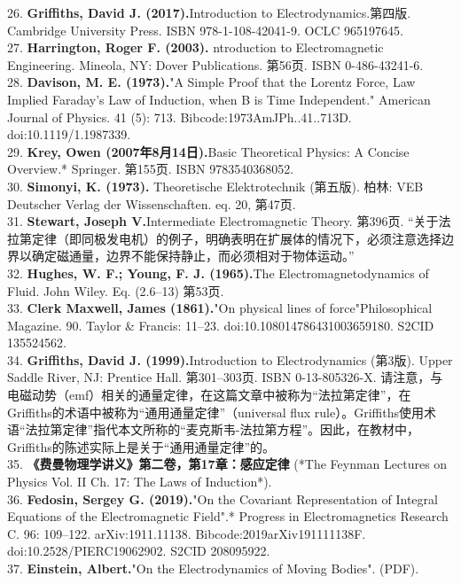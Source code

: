 26. \textbf{Griffiths, David J. (2017).}Introduction to Electrodynamics.第四版. Cambridge University Press. ISBN 978-1-108-42041-9. OCLC 965197645.\\
27. \textbf{Harrington, Roger F. (2003).} ntroduction to Electromagnetic Engineering. Mineola, NY: Dover Publications. 第56页. ISBN 0-486-43241-6.\\
28. \textbf{Davison, M. E. (1973).}"A Simple Proof that the Lorentz Force, Law Implied Faraday's Law of Induction, when B is Time Independent." American Journal of Physics. 41 (5): 713. Bibcode:1973AmJPh..41..713D. doi:10.1119/1.1987339.\\
29. \textbf{Krey, Owen (2007年8月14日).}Basic Theoretical Physics: A Concise Overview.* Springer. 第155页. ISBN 9783540368052.\\
30. \textbf{Simonyi, K. (1973).} Theoretische Elektrotechnik (第五版). 柏林: VEB Deutscher Verlag der Wissenschaften. eq. 20, 第47页.\\
31. \textbf{Stewart, Joseph V.}Intermediate Electromagnetic Theory. 第396页. “关于法拉第定律（即同极发电机）的例子，明确表明在扩展体的情况下，必须注意选择边界以确定磁通量，边界不能保持静止，而必须相对于物体运动。”\\
32. \textbf{Hughes, W. F.; Young, F. J. (1965).}The Electromagnetodynamics of Fluid. John Wiley. Eq. (2.6–13) 第53页.\\
33. \textbf{Clerk Maxwell, James (1861).}"On physical lines of force"Philosophical Magazine. 90. Taylor & Francis: 11–23. doi:10.108014786431003659180. S2CID 135524562.\\
34. \textbf{Griffiths, David J. (1999).}Introduction to Electrodynamics (第3版). Upper Saddle River, NJ: Prentice Hall. 第301–303页. ISBN 0-13-805326-X.  
   请注意，与电磁动势（emf）相关的通量定律，在这篇文章中被称为“法拉第定律”，在Griffiths的术语中被称为“通用通量定律”（universal flux rule）。Griffiths使用术语“法拉第定律”指代本文所称的“麦克斯韦-法拉第方程”。因此，在教材中，Griffiths的陈述实际上是关于“通用通量定律”的。\\
35. \textbf{《费曼物理学讲义》第二卷，第17章：感应定律} (*The Feynman Lectures on Physics Vol. II Ch. 17: The Laws of Induction*).\\
36. \textbf{Fedosin, Sergey G. (2019).}"On the Covariant Representation of Integral Equations of the Electromagnetic Field".* Progress in Electromagnetics Research C. 96: 109–122. arXiv:1911.11138. Bibcode:2019arXiv191111138F. doi:10.2528/PIERC19062902. S2CID 208095922.\\
37. \textbf{Einstein, Albert.}"On the Electrodynamics of Moving Bodies". (PDF).
